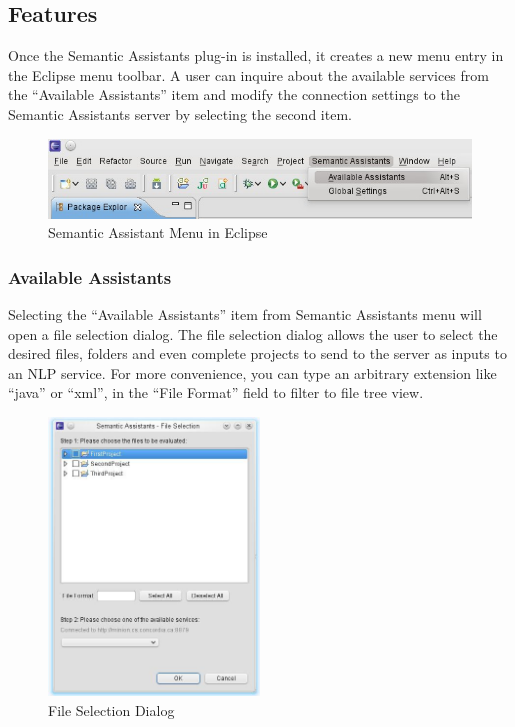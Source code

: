 \subsection{Features}
Once the Semantic Assistants plug-in is installed, it creates a new menu entry
in the Eclipse menu toolbar. A user can inquire about the available services
from the ``Available Assistants'' item and modify the connection settings to the
Semantic Assistants server by selecting the second item.
\begin{figure}[htb]
\begin{center}
  \includegraphics[width=1.0\textwidth]{pictures/eclipse_menu.jpg}
  \caption{Semantic Assistant Menu in Eclipse}
  \label{fig:eclipse_menu}
\end{center}
\end{figure}
\subsubsection{Available Assistants}
Selecting the ``Available Assistants'' item from Semantic Assistants menu will
open a file selection dialog. The file selection dialog allows the user to
select the desired files, folders and even complete projects to send to the
server as inputs to an NLP service. For more convenience, you can type an arbitrary extension like ``java'' or ``xml'', in the ``File Format'' field to filter to file tree view. 

\begin{figure}[htb]
\begin{center}
  \includegraphics[width=0.5\textwidth]{pictures/eclipse_fileSelection.jpg}
  \caption{File Selection Dialog}
  \label{fig:eclipse_fileSelection}
\end{center}
\end{figure}

